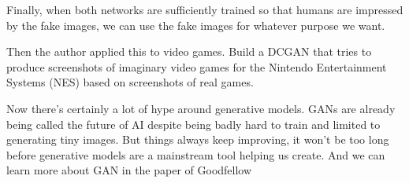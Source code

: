 \documentclass[10pt,twocolumn,letterpaper]{article}
\begin{document}
	\par
	Finally, when both networks are sufficiently trained so that humans are impressed by the fake images, we can use the fake images for whatever purpose we want.
	\par
	Then the author applied this to video games. Build a DCGAN that tries to produce screenshots of imaginary video games for the Nintendo Entertainment Systems (NES) based on screenshots of real games.
	\par
	Now there's certainly a lot of hype around generative models. GANs are already being called the future of AI despite being badly hard to train and limited to generating tiny images. But things always keep improving, it won't be too long before generative models are a mainstream tool helping us create. And we can learn more about GAN in the paper of Goodfellow \etal~\cite{Goodfellow2014Generative}
	{\small
		
		
	}
\end{document}
